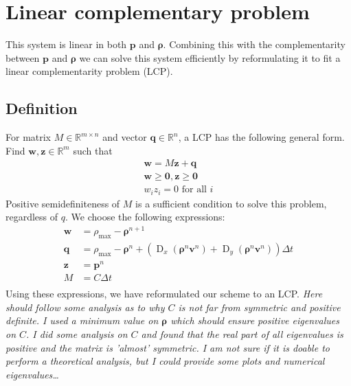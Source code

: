 \documentclass{article}
\DeclareMathOperator{\D}{D}
\renewcommand{\vec}[1]{\mathbf{#1}}
\newcommand{\gvec}[1]{\boldsymbol#1}
\begin{document}
\section{Linear complementary problem}
\label{sec:lcp}
This system is linear in both $\vec{p}$ and $\gvec{\rho}$. Combining this with the complementarity between $\vec{p}$ and $\gvec{\rho}$ we can solve this system efficiently by reformulating it to fit a linear complementarity problem (LCP).
\subsection{Definition}
For matrix $M \in \mathbb{R}^{m\times n}$ and vector $\vec{q}\in \mathbb{R}^n$, a LCP has the following general form. Find $\vec{w},\vec{z}\in \mathbb{R}^m$ such that
\begin{align}
	\vec{w}=M\vec{z}+\vec{q}\\
	\vec{w}\geq\vec{0},\vec{z}\geq\vec{0}\\
w_iz_i=0\mbox{ for all }i
\label{def:lcp}
\end{align}
Positive semidefiniteness of $M$ is a sufficient condition to solve this problem, regardless of $q$.
We choose the following expressions:
\begin{align}
	\vec{w} &= \rho_{\max}-\gvec{\rho}^{n+1}\\
	\vec{q} &= \rho_{\max}-\gvec{\rho}^n+\left(\D_x(\gvec{\rho}^n\vec{v}^n)+\D_y(\gvec{\rho}^n\vec{v}^n)\right)\Delta t\\
	\vec{z} &= \vec{p}^n\\
	M &= C\Delta t\\
	\label{eq:lcp}
\end{align}
Using these expressions, we have reformulated our scheme to an LCP.
\emph{Here should follow some analysis as to why $C$ is not far from symmetric and positive definite. I used a minimum value on $\gvec{\rho}$ which should ensure positive eigenvalues on $C$.
I did some analysis on $C$ and found that the real part of all eigenvalues is positive and the matrix is 'almost' symmetric. I am not sure if it is doable to perform a theoretical analysis, but I could provide some plots and numerical eigenvalues\dots}
\end{document}
